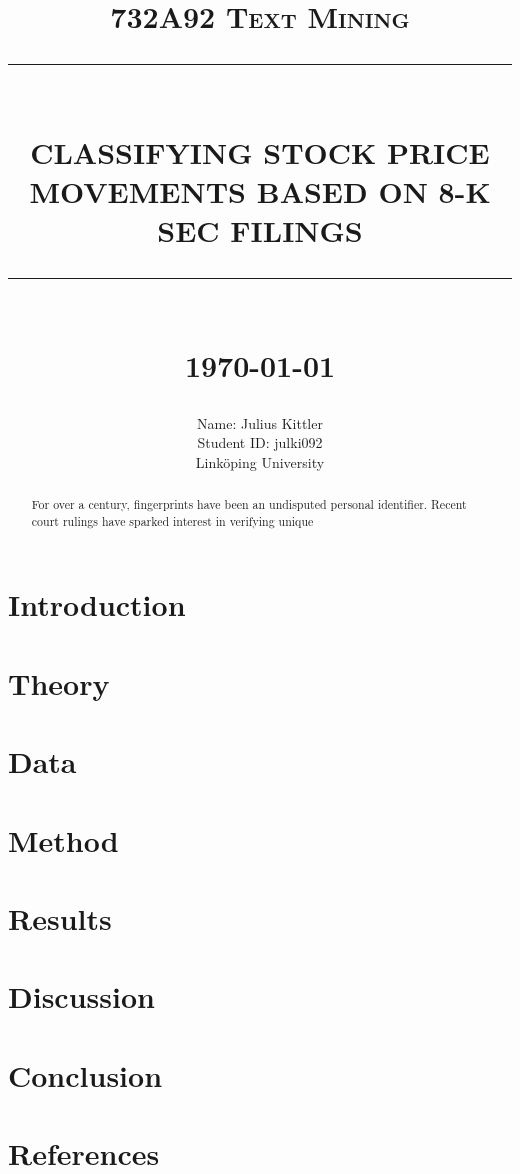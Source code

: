 \documentclass{article}
\newcommand{\HRule}[1]{\rule{\linewidth}{#1}}
\begin{document}
	
	\title{\textsc{732A92 Text Mining} \\ [2.0cm]
		\HRule{0.5pt} \\
		\LARGE \textbf{\uppercase{Classifying Stock Price Movements based on 8-K SEC filings}}
		\HRule{2pt} \\ [0.5cm]
		\normalsize \today \vspace*{5\baselineskip}}
	
	\date{}
	
	\author{
		Name: Julius Kittler \\ 
		Student ID: julki092 \\ 
		Link\"{o}ping University}
	
	\maketitle
	\newpage
	
	\begin{abstract}
		For over a century, fingerprints have been an undisputed
		personal identifier.  Recent court rulings have sparked
		interest in verifying unique
	\end{abstract}

	\tableofcontents
	\newpage

	\section{Introduction}
	\section{Theory}
	\section{Data}
	\section{Method}
	\section{Results}
	\section{Discussion}
	\section{Conclusion}
	\section{References}
	
	\cite{radioactivedecay2}
	\cite{DLS1}  

	
\printbibliography
\end{document}
